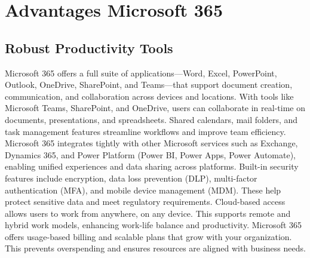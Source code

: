 \chapter{Advantages Microsoft 365}

\section{Robust Productivity Tools}



Microsoft 365 offers a full suite of applications—Word, Excel, PowerPoint, Outlook, OneDrive, SharePoint, and Teams—that support document creation, communication, and collaboration across devices and locations.
With tools like Microsoft Teams, SharePoint, and OneDrive, users can collaborate in real-time on documents, presentations, and spreadsheets. Shared calendars, mail folders, and task management features streamline workflows and improve team efficiency.
Microsoft 365 integrates tightly with other Microsoft services such as Exchange, Dynamics 365, and Power Platform (Power BI, Power Apps, Power Automate), enabling unified experiences and data sharing across platforms.
Built-in security features include encryption, data loss prevention (DLP), multi-factor authentication (MFA), and mobile device management (MDM). These help protect sensitive data and meet regulatory requirements.
Cloud-based access allows users to work from anywhere, on any device. This supports remote and hybrid work models, enhancing work-life balance and productivity.
Microsoft 365 offers usage-based billing and scalable plans that grow with your organization. This prevents overspending and ensures resources are aligned with business needs. \cite{6091325,Santi-journal}
\newpage

